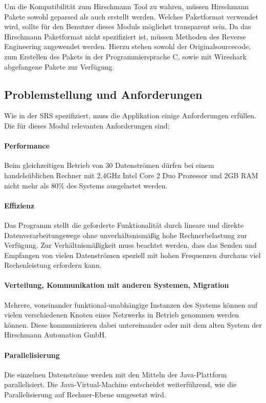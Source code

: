 Um die Kompatibilität zum Hirschmann Tool zu wahren, müssen Hirschmann Pakete sowohl geparsed als auch erstellt werden.
Welches Paketformat verwendet wird, sollte für den Benutzer dieses Moduls möglichst transparent sein. Da das Hirschmann Paketformat nicht spezifiziert ist, müssen
Methoden des Reverse Engineering angewendet werden. Hierzu stehen sowohl der Originalsourcecode, zum Erstellen des Pakets in der Programmiersprache C, sowie mit Wireshark abgefangene Pakete zur Verfügung.

\subsection{Problemstellung und Anforderungen}

Wie in der SRS spezifiziert, muss die Applikation einige Anforderungen erfüllen.
Die für dieses Modul relevanten Anforderungen sind:

\paragraph{Performance}
Beim gleichzeitigen Betrieb von 30 Datenströmen dürfen
bei einem handelsüblichen Rechner mit 2,4GHz Intel Core 2 Duo Prozessor und 2GB RAM nicht mehr als 80\%
des Systems ausgelastet werden.

\paragraph{Effizienz} Das Programm stellt die geforderte Funktionalität durch
lineare und direkte Datenverarbeitungswege ohne unverhältsnismäßig hohe
Rechnerbelastung zur Verfügung. Zur Verhältnismäßigkeit muss beachtet werden,
dass das Senden und Empfangen von vielen Datenströmen speziell mit hohen
Frequenzen durchaus viel Rechenleistung erfordern kann.

\paragraph{Verteilung, Kommunikation mit anderen Systemen, Migration}
Mehrere, voneinander funktional-unabhängige Instanzen des Systems können auf
vielen verschiedenen Knoten eines Netzwerks in Betrieb genommen werden können. Diese
kommunizieren dabei untereinander oder mit dem alten
System der Hirschmann Automation GmbH.

\paragraph{Parallelisierung}
Die einzelnen Datenströme werden mit den Mitteln der Java-Plattform
parallelisiert. Die Java-Virtual-Machine entscheidet weiterführend, wie die
Parallelisierung auf Rechner-Ebene umgesetzt wird.

